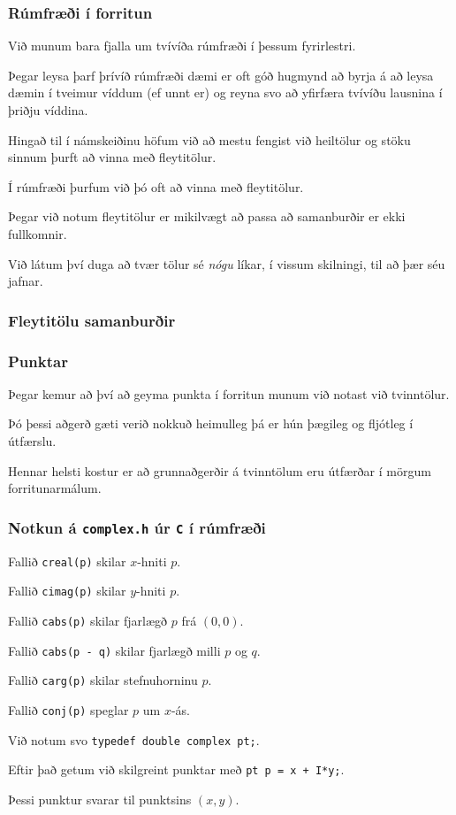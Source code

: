 {
	\frametitle{Rúmfræði í forritun}
	{
		\item<1-> Við munum bara fjalla um tvívíða rúmfræði í þessum fyrirlestri.
		\item<2-> Þegar leysa þarf þrívíð rúmfræði dæmi er oft góð hugmynd að byrja
			á að leysa dæmin í tveimur víddum (ef unnt er) og reyna svo að yfirfæra
			tvívíðu lausnina í þriðju víddina.  \item<3-> Hingað til í námskeiðinu höfum við að mestu fengist við heiltölur
			og stöku sinnum þurft að vinna með fleytitölur.
		\item<4-> Í rúmfræði þurfum við þó oft að vinna með fleytitölur.
		\item<5-> Þegar við notum fleytitölur er mikilvægt að passa að samanburðir er ekki fullkomnir.
		\item<6-> Við látum því duga að tvær tölur sé \emph{nógu} líkar, í vissum skilningi, til að þær séu jafnar.
	}
}

{
	\frametitle{Fleytitölu samanburðir}
}

{
	\frametitle{Punktar}
	{
		\item<1-> Þegar kemur að því að geyma punkta í forritun munum við notast við tvinntölur.
		\item<2-> Þó þessi aðgerð gæti verið nokkuð heimulleg þá er hún þægileg og fljótleg í útfærslu.
		\item<3-> Hennar helsti kostur er að grunnaðgerðir á tvinntölum eru útfærðar í mörgum forritunarmálum.
	}
}

{
	\frametitle{Notkun á \texttt{complex.h} úr \texttt{C} í rúmfræði}
	{
		\item<1-> Fallið \texttt{creal(p)} skilar $x$-hniti $p$.
		\item<2-> Fallið \texttt{cimag(p)} skilar $y$-hniti $p$.
		\item<3-> Fallið \texttt{cabs(p)} skilar fjarlægð $p$ frá $(0, 0)$.
		\item<4-> Fallið \texttt{cabs(p - q)} skilar fjarlægð milli $p$ og $q$.
		\item<5-> Fallið \texttt{carg(p)} skilar stefnuhorninu $p$.
		\item<6-> Fallið \texttt{conj(p)} speglar $p$ um $x$-ás.
	}
}

{
	{
		\item<1-> Við notum svo \texttt{typedef double complex pt;}.
		\item<2-> Eftir það getum við skilgreint punktar með \texttt{pt p = x + I*y;}.
		\item<3-> Þessi punktur svarar til punktsins $(x, y)$.
	}
}

